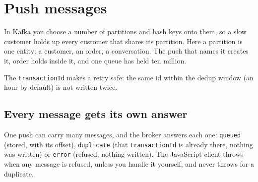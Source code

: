 
\section{Push messages}

In Kafka you choose a number of partitions and hash keys onto them, so a slow customer holds up
every customer that shares its partition. Here a partition is one entity: a customer, an order, a
conversation. The push that names it creates it, order holds inside it, and one queue has held ten
million.

The \texttt{transactionId} makes a retry safe: the same id within the dedup window (an hour by default) is
not written twice.



\subsection{Every message gets its own answer}

One push can carry many messages, and the broker answers each one: \texttt{queued} (stored, with
its offset), \texttt{duplicate} (that \texttt{transactionId} is already there, nothing was written)
or \texttt{error} (refused, nothing written). The JavaScript client throws when any message is
refused, unless you handle it yourself, and never throws for a duplicate.




